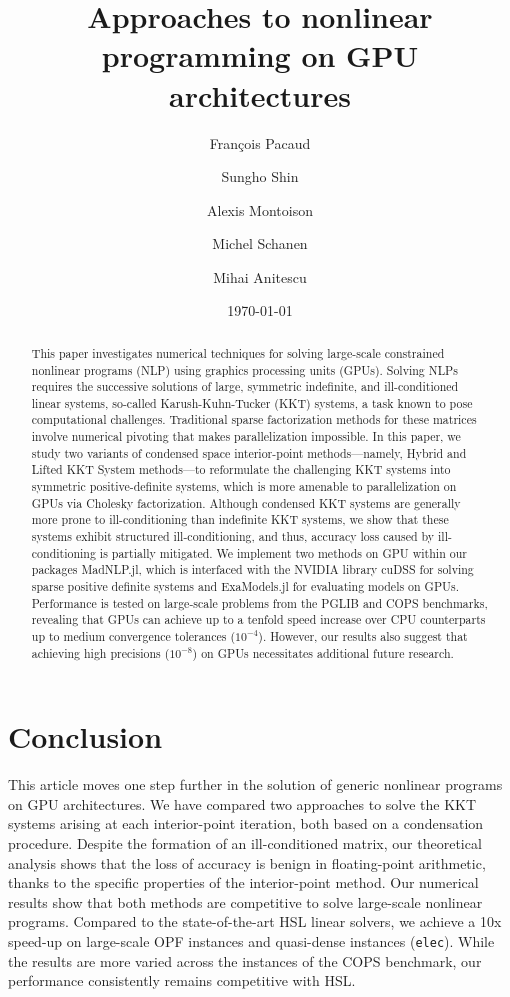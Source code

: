 \documentclass[smallextended]{svjour3}
\title{Approaches to nonlinear programming on GPU architectures}
\author{François Pacaud \and
Sungho Shin \and
Alexis Montoison \and
Michel Schanen \and
Mihai Anitescu
}
\date{\today}
\begin{document}
\maketitle

\begin{abstract}
  This paper investigates numerical techniques for solving large-scale constrained nonlinear programs (NLP) using graphics processing units (GPUs). 
  Solving NLPs requires the successive solutions of large, symmetric indefinite, and ill-conditioned linear systems, so-called Karush-Kuhn-Tucker (KKT) systems, a task known to pose computational challenges.
  Traditional sparse factorization methods for these matrices involve numerical pivoting that makes parallelization impossible.
  In this paper, we study two variants of condensed space interior-point methods---namely, Hybrid and Lifted KKT System methods---to reformulate the challenging KKT systems into symmetric positive-definite systems, which is more amenable to parallelization on GPUs via Cholesky factorization. 
  Although condensed KKT systems are generally more prone to ill-conditioning than indefinite KKT systems, we show that these systems exhibit structured ill-conditioning, and thus, accuracy loss caused by ill-conditioning is partially mitigated.
  We implement two methods on GPU within our packages MadNLP.jl, which is interfaced with the NVIDIA library cuDSS for solving sparse positive definite systems and ExaModels.jl for evaluating models on GPUs.
  Performance is tested on large-scale problems from the PGLIB and COPS benchmarks, revealing that GPUs can achieve up to a tenfold speed increase over CPU counterparts up to medium convergence tolerances ($10^{-4}$).
  However, our results also suggest that achieving high precisions ($10^{-8}$) on GPUs necessitates additional future research.
\end{abstract}










\section{Conclusion}
This article moves one step further in the solution of generic nonlinear
programs on GPU architectures. We have compared two approaches
to solve the KKT systems arising at each interior-point iteration, both
based on a condensation procedure.
Despite the formation of an ill-conditioned matrix, our theoretical analysis shows that the loss of accuracy is benign in floating-point arithmetic, thanks to the specific properties of the interior-point method.
Our numerical results show that both methods are competitive to solve large-scale
nonlinear programs.
Compared to the state-of-the-art HSL linear solvers, we achieve a 10x speed-up on large-scale OPF instances and quasi-dense instances (\texttt{elec}). While the results are more varied across the instances of the COPS benchmark, our performance consistently remains competitive with HSL.
\end{document}
